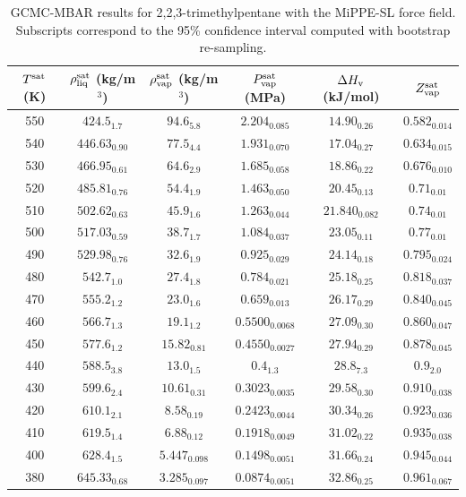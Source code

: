 \documentclass[journal=jctc,manuscript=article]{achemso}
\begin{document}
\begin{table}[htb!]
	\caption{GCMC-MBAR results for 2,2,3-trimethylpentane with the MiPPE-SL force field. Subscripts correspond to the 95\% confidence interval computed with bootstrap re-sampling.}
	\begin{center}
		\begin{tabular}{|c|c|c|c|c|c|}
			\hline
			$T^{\rm sat}$ (K) & $\rho_{\rm liq}^{\rm sat}$ (kg/m$^3$) & $\rho_{\rm vap}^{\rm sat}$ (kg/m$^3$) & $P_{\rm vap}^{\rm sat}$ (MPa) & $\Delta H_{\rm v}$ (kJ/mol) & $Z_{\rm vap}^{\rm sat}$ \\ \hline
			550 & $424.5_{1.7}$ & $94.6_{5.8}$ & $2.204_{0.085}$ & $14.90_{0.26}$ & $0.582_{0.014}$ \\
			540 & $446.63_{0.90}$ & $77.5_{4.4}$ & $1.931_{0.070}$ & $17.04_{0.27}$ & $0.634_{0.015}$ \\
			530 & $466.95_{0.61}$ & $64.6_{2.9}$ & $1.685_{0.058}$ & $18.86_{0.22}$ & $0.676_{0.010}$ \\
			520 & $485.81_{0.76}$ & $54.4_{1.9}$ & $1.463_{0.050}$ & $20.45_{0.13}$ & $0.71_{0.01}$ \\
			510 & $502.62_{0.63}$ & $45.9_{1.6}$ & $1.263_{0.044}$ & $21.840_{0.082}$ & $0.74_{0.01}$ \\
			500 & $517.03_{0.59}$ & $38.7_{1.7}$ & $1.084_{0.037}$ & $23.05_{0.11}$ & $0.77_{0.01}$ \\
			490 & $529.98_{0.76}$ & $32.6_{1.9}$ & $0.925_{0.029}$ & $24.14_{0.18}$ & $0.795_{0.024}$ \\
			480 & $542.7_{1.0}$ & $27.4_{1.8}$ & $0.784_{0.021}$ & $25.18_{0.25}$ & $0.818_{0.037}$ \\
			470 & $555.2_{1.2}$ & $23.0_{1.6}$ & $0.659_{0.013}$ & $26.17_{0.29}$ & $0.840_{0.045}$ \\
			460 & $566.7_{1.3}$ & $19.1_{1.2}$ & $0.5500_{0.0068}$ & $27.09_{0.30}$ & $0.860_{0.047}$ \\
			450 & $577.6_{1.2}$ & $15.82_{0.81}$ & $0.4550_{0.0027}$ & $27.94_{0.29}$ & $0.878_{0.045}$ \\
			440 & $588.5_{3.8}$ & $13.0_{1.5}$ & $0.4_{1.3}$ & $28.8_{7.3}$ & $0.9_{2.0}$ \\
			430 & $599.6_{2.4}$ & $10.61_{0.31}$ & $0.3023_{0.0035}$ & $29.58_{0.30}$ & $0.910_{0.038}$ \\
			420 & $610.1_{2.1}$ & $8.58_{0.19}$ & $0.2423_{0.0044}$ & $30.34_{0.26}$ & $0.923_{0.036}$ \\
			410 & $619.5_{1.4}$ & $6.88_{0.12}$ & $0.1918_{0.0049}$ & $31.02_{0.22}$ & $0.935_{0.038}$ \\
			400 & $628.4_{1.5}$ & $5.447_{0.098}$ & $0.1498_{0.0051}$ & $31.66_{0.24}$ & $0.945_{0.044}$ \\
			380 & $645.33_{0.68}$ & $3.285_{0.097}$ & $0.0874_{0.0051}$ & $32.86_{0.25}$ & $0.961_{0.067}$ \\
			\hline
		\end{tabular}
	\end{center}
\end{table}
\end{document}
